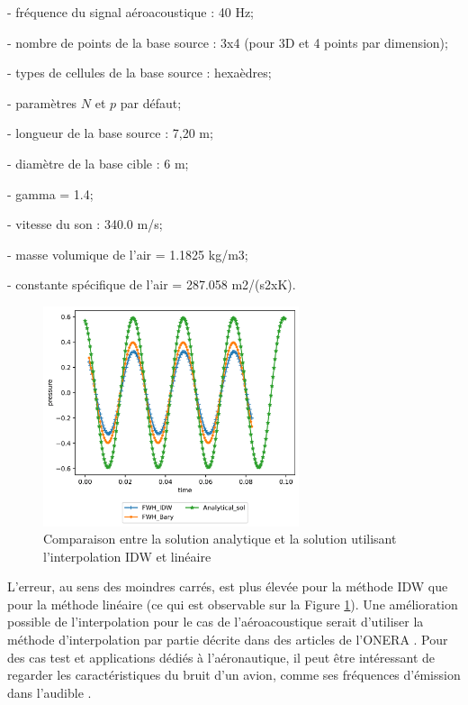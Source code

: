 \vspace{-0,2cm}
- fréquence du signal aéroacoustique : 40 Hz;

\vspace{-0,2cm}
- nombre de points de la base source : 3x4 (pour 3D et 4 points par dimension);

\vspace{-0,2cm}
- types de cellules de la base source : hexaèdres;

\vspace{-0,2cm}
- paramètres \(N\) et \(p\) par défaut;

\vspace{-0,2cm}
- longueur de la base source : 7,20 m;

\vspace{-0,2cm}
- diamètre de la base cible : 6 m;

\vspace{-0,2cm}
- gamma = 1.4;

\vspace{-0,2cm}
- vitesse du son : 340.0 m/s;

\vspace{-0,2cm}
- masse volumique de l'air = 1.1825 kg/m3;

\vspace{-0,2cm}
- constante spécifique de l'air = 287.058 m2/(s2xK).

\begin{figure}[H]
    \centering
    \includegraphics[width=0.67\textwidth]{images/onde_aac.png}
    \caption{Comparaison entre la solution analytique et la solution utilisant l'interpolation IDW et linéaire}
    \label{fig:onde_aac}
\end{figure}

L'erreur, au sens des moindres carrés, est plus élevée pour la méthode IDW que pour la méthode linéaire (ce qui est observable sur la Figure \ref{fig:onde_aac}).
Une amélioration possible de l'interpolation pour le cas de l'aéroacoustique serait d'utiliser la méthode d'interpolation par partie décrite dans des articles de l’ONERA \cite{cunha2011, cunha2016}.
Pour des cas test et applications dédiés à l'aéronautique, il peut être intéressant de regarder les caractéristiques du bruit d'un avion, comme ses fréquences d'émission dans l'audible \cite{frequence}.


